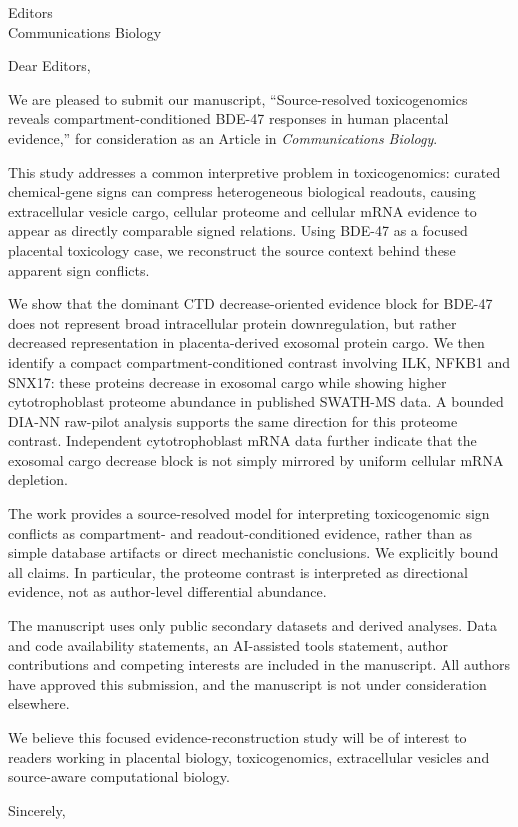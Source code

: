 \documentclass[11pt]{letter}
\date{2026-05-27}
\begin{document}
\begin{letter}{Editors\\Communications Biology}
\opening{Dear Editors,}

We are pleased to submit our manuscript, ``Source-resolved toxicogenomics reveals compartment-conditioned BDE-47 responses in human placental evidence,'' for consideration as an Article in \emph{Communications Biology}.

This study addresses a common interpretive problem in toxicogenomics: curated chemical-gene signs can compress heterogeneous biological readouts, causing extracellular vesicle cargo, cellular proteome and cellular mRNA evidence to appear as directly comparable signed relations. Using BDE-47 as a focused placental toxicology case, we reconstruct the source context behind these apparent sign conflicts.

We show that the dominant CTD decrease-oriented evidence block for BDE-47 does not represent broad intracellular protein downregulation, but rather decreased representation in placenta-derived exosomal protein cargo. We then identify a compact compartment-conditioned contrast involving ILK, NFKB1 and SNX17: these proteins decrease in exosomal cargo while showing higher cytotrophoblast proteome abundance in published SWATH-MS data. A bounded DIA-NN raw-pilot analysis supports the same direction for this proteome contrast. Independent cytotrophoblast mRNA data further indicate that the exosomal cargo decrease block is not simply mirrored by uniform cellular mRNA depletion.

The work provides a source-resolved model for interpreting toxicogenomic sign conflicts as compartment- and readout-conditioned evidence, rather than as simple database artifacts or direct mechanistic conclusions. We explicitly bound all claims. In particular, the proteome contrast is interpreted as directional evidence, not as author-level differential abundance.

The manuscript uses only public secondary datasets and derived analyses. Data and code availability statements, an AI-assisted tools statement, author contributions and competing interests are included in the manuscript. All authors have approved this submission, and the manuscript is not under consideration elsewhere.

We believe this focused evidence-reconstruction study will be of interest to readers working in placental biology, toxicogenomics, extracellular vesicles and source-aware computational biology.

\closing{Sincerely,}
\end{letter}
\end{document}
